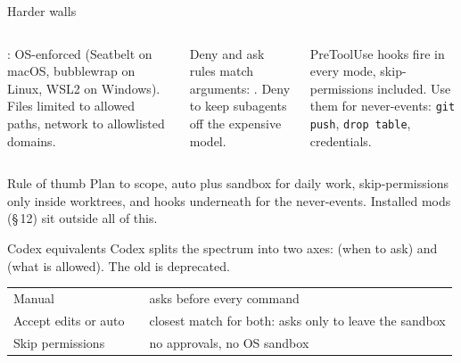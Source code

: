 \documentclass[aspectratio=169,11pt,t]{beamer}
\begin{document}
\begin{frame}{Harder walls}
  \begin{columns}[T,onlytextwidth]
      \par\vspace{0.3em}\footnotesize
      : OS-enforced (Seatbelt on macOS, bubblewrap on Linux, WSL2 on Windows). Files limited to allowed paths, network to allowlisted domains.
      \par\vspace{0.3em}\footnotesize
      Deny and ask rules match arguments: . Deny  to keep subagents off the expensive model.
      \par\vspace{0.3em}\footnotesize
      PreToolUse hooks fire in every mode, skip-permissions included. Use them for never-events: \texttt{git push}, \texttt{drop table}, credentials.
  \end{columns}\par\vspace{0.5em}
  \begin{callout}{Rule of thumb}
    Plan to scope, auto plus sandbox for daily work, skip-permissions only inside worktrees, and hooks underneath for the never-events. Installed mods (\S\,12) sit outside all of this.
  \end{callout}
\end{frame}

\begin{frame}{Codex equivalents}
  Codex splits the spectrum into two axes:  (when to ask) and  (what is allowed). The old  is deprecated.\par\vspace{0.6em}
  \small
  \begin{tabularx}{\textwidth}{@{}L{3.3cm}L{6.4cm}Y@{}}
    \toprule
     &  & \\
    \midrule
    Manual &  & asks before every command\\
    Accept edits or auto &  & closest match for both: asks only to leave the sandbox\\
    Skip permissions &  & no approvals, no OS sandbox\\
    \bottomrule
  \end{tabularx}
\end{frame}
\end{document}
